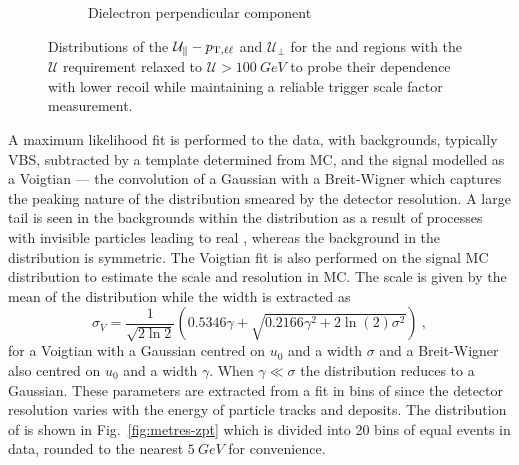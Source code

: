 \begin{figure}[htb]
\begin{subfigure}[b]{0.49\textwidth}
        \caption{Dielectron perpendicular component}
        \label{subfigd:recoil-calib-dists}
    \end{subfigure}
    \caption[Recoil distributions in dilepton final states.]{
        Distributions of the $\mathcal{U}_{\parallel}-p_{\mathrm{T},\ell\ell}$ and $\mathcal{U}_{\perp}$ for the \dimuplusjets and \dieleplusjets regions with the $\mathcal{U}$ requirement relaxed to ${\mathcal{U}>\SI{100}{GeV}}$ to probe their dependence with lower recoil while maintaining a reliable \ptmiss trigger scale factor measurement.
    }
    \label{fig:recoil-calib-dists}
\end{figure}

A maximum likelihood fit is performed to the data, with backgrounds, typically VBS, subtracted by a template determined from MC, and the signal modelled as a Voigtian --- the convolution of a Gaussian with a Breit-Wigner which captures the peaking nature of the distribution smeared by the detector resolution. A large tail is seen in the backgrounds within the \recoilpara distribution as a result of processes with invisible particles leading to real \ptmiss, whereas the background in the \recoilperp distribution is symmetric. The Voigtian fit is also performed on the signal MC distribution to estimate the scale and resolution in MC. The scale is given by the mean of the distribution while the width is extracted as
%
\begin{equation}
    \sigma_V = \frac{1}{\sqrt{2\ln 2}}\left(0.5346\gamma + \sqrt{0.2166\gamma^2 + 2\ln(2) \sigma^2}\right)\ ,
\end{equation}
%
for a Voigtian with a Gaussian centred on $u_0$ and a width $\sigma$ and a Breit-Wigner also centred on $u_0$ and a width $\gamma$. When $\gamma\ll\sigma$ the distribution reduces to a Gaussian. These parameters are extracted from a fit in bins of \ptll since the detector resolution varies with the energy of particle tracks and deposits. The distribution of \ptll is shown in Fig.~\ref{fig:metres-zpt} which is divided into 20 bins of equal events in data, rounded to the nearest ${\SI{5}{GeV}}$ for convenience.
%
